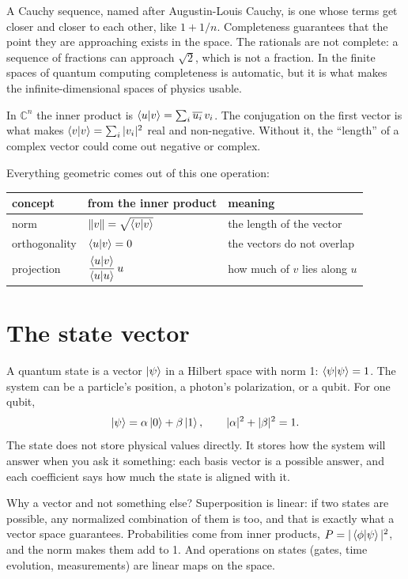 A Cauchy sequence, named after Augustin-Louis Cauchy, is one whose terms get
closer and closer to each other, like $1 + 1/n$. Completeness guarantees that
the point they are approaching exists in the space. The rationals are not
complete: a sequence of fractions can approach $\sqrt{2}$, which is not a fraction.
In the finite spaces of quantum computing completeness is automatic, but it is
what makes the infinite-dimensional spaces of physics usable.

In $\mathbb{C}^n$ the inner product is
$\braket{u|v} = \sum_i \overline{u_i}\,v_i$. The conjugation on the first vector is
what makes $\braket{v|v} = \sum_i |v_i|^2$ real and non-negative. Without it, the
``length'' of a complex vector could come out negative or complex.

Everything geometric comes out of this one operation:

\begin{center}
\begin{tabular}{lll}
\hline
concept & from the inner product & meaning \\
\hline
norm & $\|v\| = \sqrt{\braket{v|v}}$ & the length of the vector \\
orthogonality & $\braket{u|v} = 0$ & the vectors do not overlap \\
projection & $\dfrac{\braket{u|v}}{\braket{u|u}}\,u$ & how much of $v$ lies along $u$ \\
\hline
\end{tabular}
\end{center}

\section{The state vector}

A quantum state is a vector $\ket{\psi}$ in a Hilbert space with norm 1:
$\braket{\psi|\psi} = 1$. The system can be a particle's position, a photon's
polarization, or a qubit. For one qubit,
\[
  \ket{\psi} = \alpha\ket{0} + \beta\ket{1}, \qquad |\alpha|^2 + |\beta|^2 = 1 .
\]
The state does not store physical values directly. It stores how the system will
answer when you ask it something: each basis vector is a possible answer, and each
coefficient says how much the state is aligned with it.

Why a vector and not something else? Superposition is linear: if two states are
possible, any normalized combination of them is too, and that is exactly what a
vector space guarantees. Probabilities come from inner products,
$P = |\braket{\phi|\psi}|^2$, and the norm makes them add to 1. And operations on
states (gates, time evolution, measurements) are linear maps on the space.


